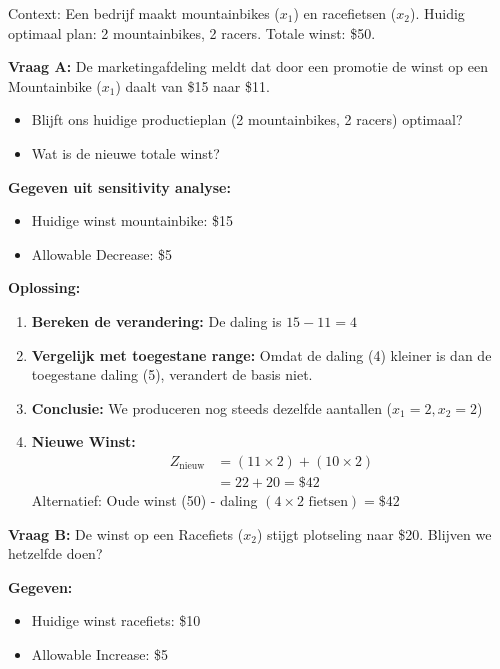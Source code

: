\documentclass[a4paper,11pt]{article}
\begin{document}
\begin{oefenblok}
    Context: Een bedrijf maakt mountainbikes ($x_1$) en racefietsen ($x_2$).
    Huidig optimaal plan: 2 mountainbikes, 2 racers. Totale winst: \$50.

    \textbf{Vraag A:} De marketingafdeling meldt dat door een promotie de winst op een Mountainbike ($x_1$) daalt van \$15 naar \$11.
    \begin{itemize}
        \item Blijft ons huidige productieplan (2 mountainbikes, 2 racers) optimaal?
        \item Wat is de nieuwe totale winst?
    \end{itemize}

    \textbf{Gegeven uit sensitivity analyse:}
    \begin{itemize}
        \item Huidige winst mountainbike: \$15
        \item Allowable Decrease: \$5
    \end{itemize}

    \textbf{Oplossing:}
    \begin{enumerate}
        \item \textbf{Bereken de verandering:} De daling is $15 - 11 = 4$
        \item \textbf{Vergelijk met toegestane range:}
              Omdat de daling (4) kleiner is dan de toegestane daling (5), verandert de basis niet.
        \item \textbf{Conclusie:} We produceren nog steeds dezelfde aantallen ($x_1 = 2, x_2 = 2$)
        \item \textbf{Nieuwe Winst:}
              \begin{align*}
                  Z_{\text{nieuw}} & = (11 \times 2) + (10 \times 2) \\
                                   & = 22 + 20 = \$42
              \end{align*}
              Alternatief: Oude winst (50) - daling $(4 \times 2 \text{ fietsen}) = \$42$
    \end{enumerate}

    \vspace{5mm}

    \textbf{Vraag B:} De winst op een Racefiets ($x_2$) stijgt plotseling naar \$20. Blijven we hetzelfde doen?

    \textbf{Gegeven:}
    \begin{itemize}
        \item Huidige winst racefiets: \$10
        \item Allowable Increase: \$5
    \end{itemize}


\end{oefenblok}
\end{document}
